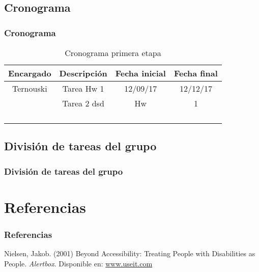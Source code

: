 \subsection{Cronograma}
\begin{frame}
	\frametitle{Cronograma}
	\begin{table}[]
		\centering
		\caption{Cronograma primera etapa}
		\begin{tabular}{cccc}
			Encargado & Descripción & Fecha inicial & Fecha final \\ \hline
			Ternouski & Tarea Hw 1  & 12/09/17       & 12/12/17    \\
						& Tarea  2 dsd     & Hw            & 1           \\
						&             &               &             \\
						&             &               &             \\
						&             &               &             \\
						&             &               &             \\ \hline
		\end{tabular}
	\end{table}
\end{frame}

\subsection{División de tareas del grupo}
\begin{frame}
	\frametitle{División de tareas del grupo}

\end{frame}

\section{Referencias}

\begin{frame}
	\frametitle{Referencias}
	\footnotesize{
	\begin{thebibliography}{99}
		 Nielsen, Jakob. (2001)
		\newblock Beyond Accessibility: Treating People with Disabilities as People.
		\newblock \emph{Alertbox}.
		Disponible en:
		\href{http://www.useit.com/alertbox/20011111.html}{www.useit.com}
	\end{thebibliography}
	}
\end{frame}